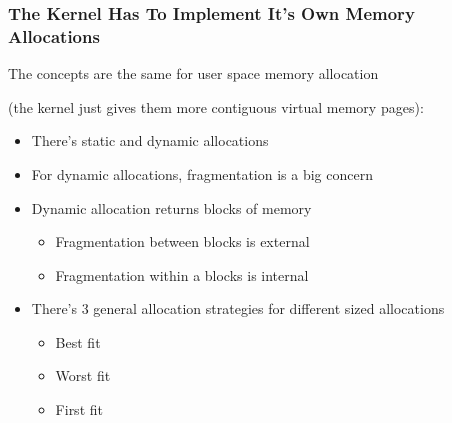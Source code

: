   \begin{frame}
    \frametitle{The Kernel Has To Implement It's Own Memory Allocations}

    The concepts are the same for user space memory allocation

    (the kernel just gives them more contiguous virtual memory pages):

    \begin{itemize}
      \item There's static and dynamic allocations
      \item For dynamic allocations, fragmentation is a big concern
      \item Dynamic allocation returns blocks of memory
        \begin{itemize}
          \item Fragmentation between blocks is external
          \item Fragmentation within a blocks is internal
        \end{itemize}
      \item There's 3 general allocation strategies for different sized
            allocations
        \begin{itemize}
          \item Best fit
          \item Worst fit
          \item First fit
        \end{itemize}
    \end{itemize}
  \end{frame}

